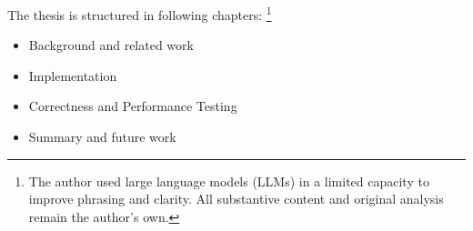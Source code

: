 The thesis is structured in following chapters: \footnote{The author used large language models (LLMs) in a limited capacity to improve phrasing and clarity. All substantive content and original analysis remain the author's own.}

\begin{itemize}
  \item Background and related work
  \item Implementation
  \item Correctness and Performance Testing
  \item Summary and future work
\end{itemize}
